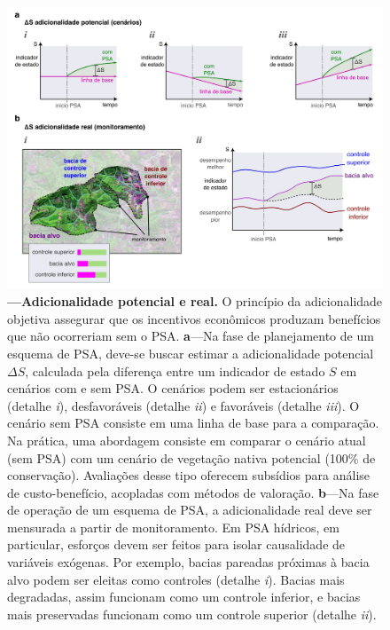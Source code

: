 \documentclass[./main.tex]{subfiles}
\begin{document}
\begin{figure}[t!] 
\centering				
\includegraphics[width=0.98\linewidth]{figs/fig_add.jpg}		
\caption[Adicionalidade potencial e real.]
{\textbf{---\;Adicionalidade potencial e real.}
    O princípio da adicionalidade objetiva assegurar que os incentivos econômicos produzam benefícios que não ocorreriam sem o PSA.
    \;\textbf{a}\;---\;Na fase de planejamento de um esquema de PSA, deve-se buscar estimar a adicionalidade potencial $\Delta S$, calculada pela diferença entre um indicador de estado $S$ em cenários com e sem PSA. O cenários podem ser estacionários (detalhe \textrm{\textit{i}}), desfavoráveis (detalhe \textrm{\textit{ii}}) e favoráveis (detalhe \textrm{\textit{iii}}). O cenário sem PSA consiste em uma linha de base para a comparação. Na prática, uma abordagem consiste em comparar o cenário atual (sem PSA) com um cenário de vegetação nativa potencial (100\% de conservação). Avaliações desse tipo oferecem subsídios para análise de custo-benefício, acopladas com métodos de valoração.    
    \;\textbf{b}\;---\;Na fase de operação de um esquema de PSA, a adicionalidade real deve ser mensurada a partir de monitoramento. Em PSA hídricos, em particular, esforços devem ser feitos para isolar causalidade de variáveis exógenas. Por exemplo, bacias pareadas próximas à bacia alvo podem ser eleitas como controles (detalhe \textrm{\textit{i}}). Bacias mais degradadas, assim funcionam como um controle inferior, e bacias mais preservadas funcionam como um controle superior (detalhe \textrm{\textit{ii}}).    
}
\label{fig:eco:add} 		
\end{figure}
\end{document}
